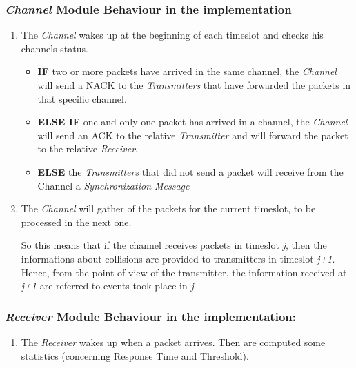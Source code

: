 \subsubsection{\textit{Channel} Module Behaviour in the implementation}
\begin{enumerate}
	\item The \textit{Channel} wakes up at the beginning of each timeslot and checks his channels status.
	\begin{itemize}
		\item \textbf{IF} two or more packets have arrived in the same channel, the \textit{Channel} will send a NACK to the \textit{Transmitters} that have forwarded the packets in that specific channel.
		\item \textbf{ELSE IF} one and only one packet has arrived in a channel, the \textit{Channel} will send an ACK to the relative \textit{Transmitter} and will forward the packet to the relative \textit{Receiver}.
		\item \textbf{ELSE} the \textit{Transmitters} that did not send a packet will receive from the Channel a \textit{Synchronization Message}
	\end{itemize}
	\item The \textit{Channel} will gather of the packets for the current timeslot, to be processed in the next one.
	
	\noindent So this means that if the channel receives packets in timeslot \emph{j}, then the informations about collisions are provided to transmitters in timeslot \emph{j+1}. Hence, from the point of view of the transmitter, the information received at \emph{j+1} are referred to events took place in \emph{j}
\end{enumerate}
\subsubsection{\textit{Receiver} Module Behaviour in the implementation:}
\begin{enumerate}
	\item The \textit{Receiver} wakes up when a packet arrives. Then are computed some statistics (concerning Response Time and Threshold).
\end{enumerate}